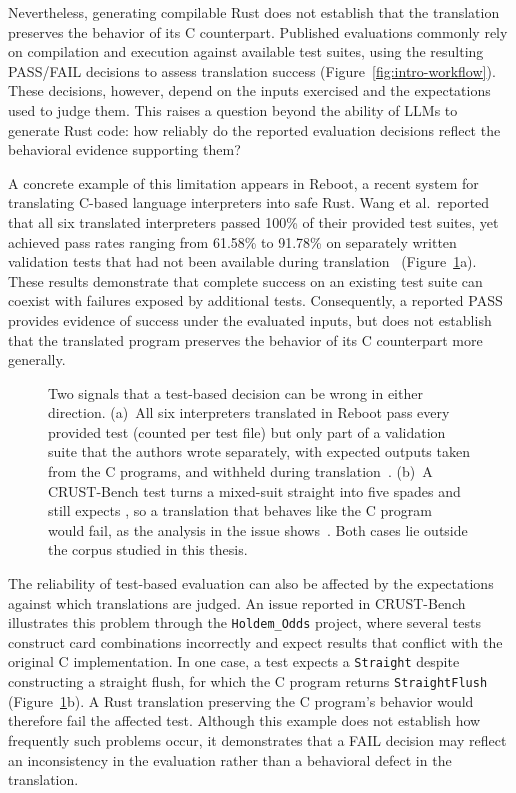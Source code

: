Nevertheless, generating compilable Rust does not establish that the translation preserves the behavior of its C counterpart. Published evaluations commonly rely on compilation and execution against available test suites, using the resulting PASS/FAIL decisions to assess translation success (Figure~\ref{fig:intro-workflow}). These decisions, however, depend on the inputs exercised and the expectations used to judge them. This raises a question beyond the ability of LLMs to generate Rust code: how reliably do the reported evaluation decisions reflect the behavioral evidence supporting them?

A concrete example of this limitation appears in Reboot, a recent system for translating C-based language interpreters into safe Rust. Wang et al.\ reported that all six translated interpreters passed 100\% of their provided test suites, yet achieved pass rates ranging from 61.58\% to 91.78\% on separately written validation tests that had not been available during translation~\cite{wang2026reboot} (Figure~\ref{fig:intro-signals}a). These results demonstrate that complete success on an existing test suite can coexist with failures exposed by additional tests. Consequently, a reported PASS provides evidence of success under the evaluated inputs, but does not establish that the translated program preserves the behavior of its C counterpart more generally.

\begin{figure}[htbp]
\centering
\resizebox{\linewidth}{!}{}
\caption{Two signals that a test-based decision can be wrong in either
direction. (a)~All six interpreters translated in Reboot pass every
provided test (counted per test file) but only part of a validation suite
that the authors wrote separately, with expected outputs taken from the C
programs, and withheld during translation~\cite{wang2026reboot}.
(b)~A CRUST-Bench test turns a mixed-suit straight into five spades and
still expects , so a translation that behaves like the C
program would fail, as the analysis in the issue shows~\cite{crustbench-issues}.
Both cases lie outside the corpus studied in this thesis.}
\label{fig:intro-signals}
\end{figure}

The reliability of test-based evaluation can also be affected by the expectations against which translations are judged. An issue reported in CRUST-Bench illustrates this problem through the \texttt{Holdem\_Odds} project, where several tests construct card combinations incorrectly and expect results that conflict with the original C implementation. In one case, a test expects a \texttt{Straight} despite constructing a straight flush, for which the C program returns \texttt{StraightFlush}~\cite{crustbench-issues} (Figure~\ref{fig:intro-signals}b). A Rust translation preserving the C program's behavior would therefore fail the affected test. Although this example does not establish how frequently such problems occur, it demonstrates that a FAIL decision may reflect an inconsistency in the evaluation rather than a behavioral defect in the translation.

